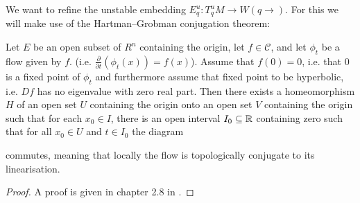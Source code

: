 We want to refine the unstable embedding $E^u_q:T^u_qM\to W(q\to)$. For this we will make use of the Hartman--Grobman conjugation theorem:
\begin{theorem}
	Let $E$ be an open subset of $R^n$ containing the origin, let $f\in \mathcal{C}$, and let $\phi_t$ be a flow given by $f$. (i.e. $\frac{\partial}{\partial t} (\phi_t(x))=f(x)$). Assume that $f(0)=0$, i.e. that $0$ is a fixed point of $\phi_t$ and furthermore assume that fixed point to be hyperbolic, i.e. $Df$ has no eigenvalue with zero real part. Then there exists a homeomorphism $H$ of an open set $U$ containing the origin onto an open set $V$ containing the origin such that for each $x_0\in I$, there is an open interval $I_0\subseteq  \mathbb{R}$ containing zero such that for all $x_0\in U$ and $t\in I_0$ the diagram
	\begin{center}
	\end{center}  commutes, meaning that locally the flow is topologically conjugate to its linearisation.
\end{theorem}
\begin{proof}A proof is given in chapter 2.8 in \cite{Perko2001}.
\end{proof}


